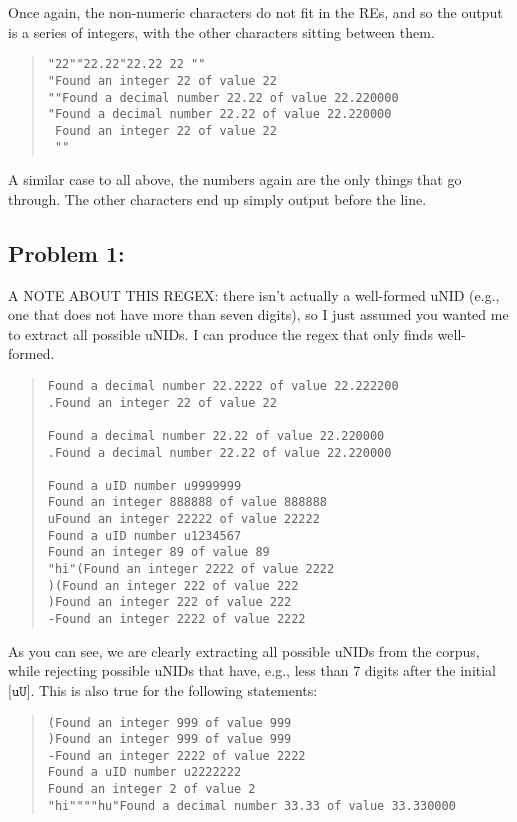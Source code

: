 \documentclass[a4paper]{article}
\begin{document}
Once again, the non-numeric characters do not fit in the REs, and so the output is a series of integers, with the other characters sitting between them.

\begin{quote}
\begin{verbatim}
"22""22.22"22.22 22 ""
"Found an integer 22 of value 22
""Found a decimal number 22.22 of value 22.220000
"Found a decimal number 22.22 of value 22.220000
 Found an integer 22 of value 22
 ""
 \end{verbatim}
\end{quote}

A similar case to all above, the numbers again are the only things that go through. The other characters end up simply output before the line.

\subsection*{Problem 1:}

A NOTE ABOUT THIS REGEX: there isn't actually a well-formed uNID (e.g., one that does not have more than seven digits), so I just assumed you wanted me to extract all possible uNIDs. I can produce the regex that only finds well-formed.

\begin{quote}
\begin{verbatim}
Found a decimal number 22.2222 of value 22.222200
.Found an integer 22 of value 22

Found a decimal number 22.22 of value 22.220000
.Found a decimal number 22.22 of value 22.220000

Found a uID number u9999999
Found an integer 888888 of value 888888
uFound an integer 22222 of value 22222
Found a uID number u1234567
Found an integer 89 of value 89
"hi"(Found an integer 2222 of value 2222
)(Found an integer 222 of value 222
)Found an integer 222 of value 222
-Found an integer 2222 of value 2222
\end{verbatim}
\end{quote}

As you can see, we are clearly extracting all possible uNIDs from the corpus, while rejecting possible uNIDs that have, e.g., less than 7 digits after the initial $\texttt{[uU]}$. This is also true for the following statements:

\begin{quote}
\begin{verbatim}
(Found an integer 999 of value 999
)Found an integer 999 of value 999
-Found an integer 2222 of value 2222
Found a uID number u2222222
Found an integer 2 of value 2
"hi""""hu"Found a decimal number 33.33 of value 33.330000
\end{verbatim}
\end{quote}
\end{document}
